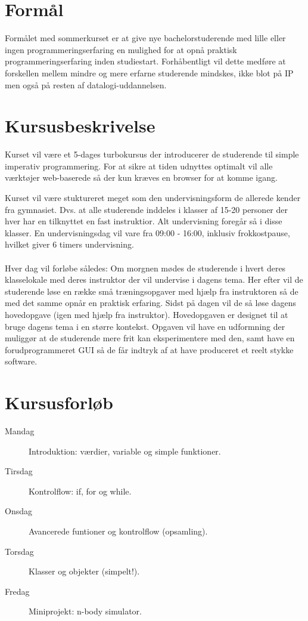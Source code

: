 \documentclass[11pt,a4paper]{article}
\begin{document}
\maketitle


\section{Formål}
Formålet med sommerkurset er at give nye bachelorstuderende med lille eller ingen
programmeringserfaring en mulighed for at opnå praktisk programmeringserfaring   
inden studiestart. Forhåbentligt vil dette medføre at forskellen mellem mindre
og mere erfarne studerende mindskes, ikke blot på IP men også på resten af 
datalogi-uddannelsen.

\section{Kursusbeskrivelse}
Kurset vil være et 5-dages turbokursus der introducerer de studerende til simple
imperativ programmering. For at sikre at tiden udnyttes optimalt vil alle 
værktøjer web-baserede så der kun kræves en browser for at komme igang.

Kurset vil være stuktureret meget som den undervisningsform de allerede kender
fra gymnasiet. Dvs. at alle studerende inddeles i klasser af 15-20 personer der
hver har en tilknyttet en fast instruktior. Alt undervisning foregår så i disse
klasser. En undervisningsdag vil vare fra 09:00 - 16:00, inklusiv frokkostpause,
hvilket giver 6 timers undervisning.
\\\\
Hver dag vil forløbe således: Om morgnen mødes de studerende i hvert deres 
klasselokale med deres instruktor der vil undervise i dagens tema. Her efter vil 
de studerende løse en række små træningsopgaver med hjælp fra instruktoren så de
med det samme opnår en praktisk erfaring. Sidst på dagen vil de så løse dagens
hovedopgave (igen med hjælp fra instruktor). Hovedopgaven er designet til at 
bruge dagens tema i en større kontekst. Opgaven vil have en udformning der 
muliggør at de studerende mere frit kan eksperimentere med den, samt have en 
forudprogrammeret GUI så de får indtryk af at have produceret et reelt stykke 
software.

\section{Kursusforløb}
\begin{description}
  \item[Mandag] Introduktion: værdier, variable og simple funktioner.
  \item[Tirsdag] Kontrolflow: if, for og while.
  \item[Onsdag] Avancerede funtioner og kontrolflow (opsamling).
  \item[Torsdag] Klasser og objekter (simpelt!).
  \item[Fredag] Miniprojekt: n-body simulator.
\end{description}
\end{document}
